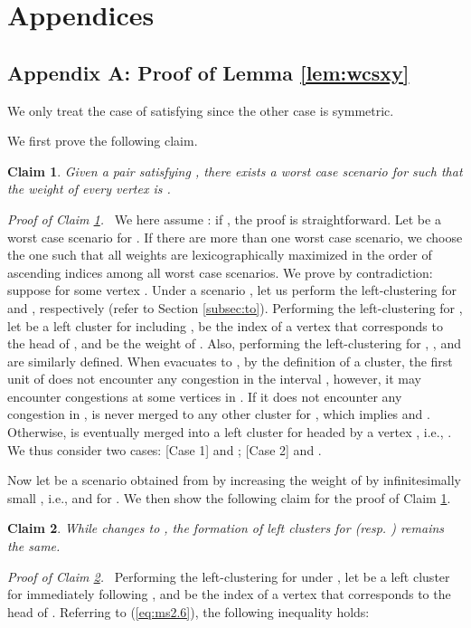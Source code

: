 \documentclass[a4paper]{llncs}
\newtheorem{clm}{Claim}
\begin{document}
\clearpage

\section*{Appendices}

\subsection*{Appendix A: Proof of Lemma \ref{lem:wcsxy}}
\label{app:a}

We only treat the case of  satisfying  since the other case is symmetric.

We first prove the following claim.
\begin{clm}
Given a pair  satisfying ,
there exists a worst case scenario for  such that 
the weight of every vertex  is .
\label{clm:2}
\end{clm}

\noindent
{\it Proof of Claim \ref{clm:2}.} \
We here assume : if , the proof is straightforward.
Let  be a worst case scenario for .
If there are more than one worst case scenario, 
we choose the one such that all weights are lexicographically maximized in the order of ascending indices
among all worst case scenarios.
We prove by contradiction: suppose  for some vertex . 
Under a scenario , let us perform the left-clustering for  and , respectively (refer to Section \ref{subsec:to}).
Performing the left-clustering for ,
let  be a left cluster for  including , 
 be the index of a vertex that corresponds to the head of ,
and  be the weight of .
Also, performing the left-clustering for , ,  and  are similarly defined. 
When  evacuates to , 
by the definition of a cluster, the first unit of  does not encounter any congestion in the interval ,
however, it may encounter congestions at some vertices in .
If it does not encounter any congestion in , 
 is never merged to any other cluster for ,
which implies  and .
Otherwise,  is eventually merged into a left cluster for  headed by a vertex , i.e., .
We thus consider two cases: 
[Case 1]  and ; 
[Case 2]  and .



Now let  be a scenario obtained from  by increasing the weight of  by infinitesimally small , 
i.e.,  and  for .
We then show the following claim for the proof of Claim \ref{clm:2}.
\begin{clm}
While  changes to , 
the formation of left clusters for  (resp. ) remains the same.
\label{clm:1}
\end{clm}
{\it Proof of Claim \ref{clm:1}.}  \
Performing the left-clustering for  under ,
let  be a left cluster for  immediately following ,
and 
be the index of a vertex that corresponds to the head of .
Referring to (\ref{eq:ms2.6}), the following inequality holds:
\end{document}

